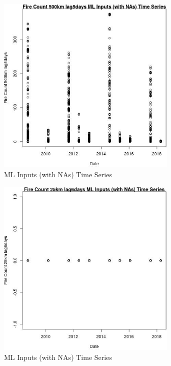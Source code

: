 \begin{figure} 
\centering  
\includegraphics[width=0.77\textwidth]{Code_Outputs/Report_ML_input_PM25_Step4_part_e_de_duplicated_aves_compiled_2019-05-18wNAs_Fire_Count_500km_lag5daysvDate.jpg} 
\caption{\label{fig:Report_ML_input_PM25_Step4_part_e_de_duplicated_aves_compiled_2019-05-18wNAsFire_Count_500km_lag5daysvDate}ML Inputs (with NAs) Time Series} 
\end{figure} 
 

\begin{figure} 
\centering  
\includegraphics[width=0.77\textwidth]{Code_Outputs/Report_ML_input_PM25_Step4_part_e_de_duplicated_aves_compiled_2019-05-18wNAs_Fire_Count_25km_lag6daysvDate.jpg} 
\caption{\label{fig:Report_ML_input_PM25_Step4_part_e_de_duplicated_aves_compiled_2019-05-18wNAsFire_Count_25km_lag6daysvDate}ML Inputs (with NAs) Time Series} 
\end{figure} 
 

